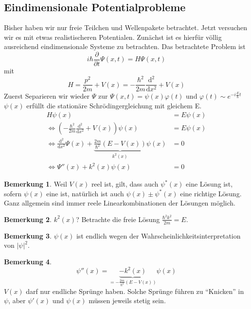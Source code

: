 \documentclass[oneside]{book}
\theoremstyle{definition}
\newtheorem*{bemerkung*}{Bemerkung}
\renewcommand{\d}{\mathrm d}
\newcommand{\ddd}[2]{\frac{\d #1}{\d #2}}
\newcommand{\fpartial}[1]{\frac{\partial}{\partial #1}}
\newcommand{\vp}{\varphi}
\begin{document}
\subsection{Eindimensionale Potentialprobleme}
Bisher haben wir nur freie Teilchen und Wellenpakete betrachtet. Jetzt versuchen wir es mit etwas realistischeren Potentialen. Zunächst ist es hierfür völlig ausreichend eindimensionale Systeme zu betrachten. Das betrachtete Problem ist
$$i\hbar \fpartial{t} \Psi(x, t) = H \Psi(x, t)$$
mit
$$H = \frac{p^2}{2m} + V(x) = - \frac{\hbar^2}{2m} \ddd{^2}{x^2} + V(x)$$
Zuerst Separieren wir wieder $\Psi$ zur $\Psi(x, t) = \psi(x) \vp(t)$ und $\vp(t) \sim e^{-i \frac{E}{\hbar} t}$\\
$\psi(x)$ erfüllt die stationäre Schrödingergleichung mit gleichem E.
\begin{align*}
	H \psi(x) &= E \psi(x)\\
	\Leftrightarrow (- \frac{\hbar^2}{2m} \ddd{^2}{x^2} + V(x)) \psi(x) &= E \psi(x)\\
	\Leftrightarrow \ddd{^2}{x^2} \Psi(x) + \underbrace{\frac{2m}{\hbar^2}(E - V(x))}_{k^2(x)} \psi(x) &= 0\\
	\Leftrightarrow \Psi''(x) + k^2(x) \psi(x) &= 0
\end{align*}

\begin{bemerkung*}
	Weil $V(x)$ reel ist, gilt, dass auch $\psi^\ast(x)$ eine Lösung ist, sofern $\psi(x)$ eine ist, natürlich ist auch $\psi(x) \pm \psi^\ast(x)$ eine richtige Lösung. Ganz allgemein sind immer reele Linearkombinationen der Lösungen möglich.
\end{bemerkung*}

\begin{bemerkung*}
	$k^2(x)$? Betrachte die freie Lösung $\frac{\hbar^2 k^2}{2m} = E$.
\end{bemerkung*}

\begin{bemerkung*}
	$\psi(x)$ ist endlich wegen der Wahrscheinlichkeitsinterpretation von $|\psi|^2$.
\end{bemerkung*}

\begin{bemerkung*}
	$$\psi''(x) = \underbrace{- k^2(x)}_{= - \frac{2m}{\hbar^2} (E - V(x))} \psi(x)$$
	$V(x)$ darf nur endliche Sprünge haben. Solche Sprünge führen zu "`Knicken"' in $\psi$, aber $\psi'(x)$ und $\psi(x)$ müssen jeweils stetig sein.
\end{bemerkung*}
\end{document}
